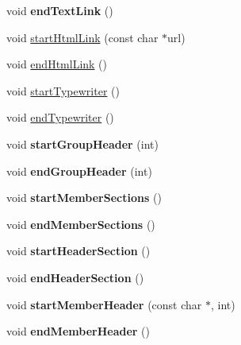 \begin{DoxyCompactItemize}
\mbox{\label{class_man_generator_ae0b59e20362769f00731c90f0e3fdc00}} 
void {\bfseries end\+Text\+Link} ()
\item 
void \mbox{\hyperlink{class_man_generator_a605e678d3be65519e6b94dff6e403e79}{start\+Html\+Link}} (const char $\ast$url)
\item 
void \mbox{\hyperlink{class_man_generator_a7323695cedb872064ddb450875b2baea}{end\+Html\+Link}} ()
\item 
void \mbox{\hyperlink{class_man_generator_aa03f575a82549d2393bb080337769f1c}{start\+Typewriter}} ()
\item 
void \mbox{\hyperlink{class_man_generator_a918922201985cac387c671a9767021d1}{end\+Typewriter}} ()
\item 
\mbox{\label{class_man_generator_a69dbc09e1398a0f64796d28a45642bba}} 
void {\bfseries start\+Group\+Header} (int)
\item 
\mbox{\label{class_man_generator_a826a7e069686709295c162b2b2db7e25}} 
void {\bfseries end\+Group\+Header} (int)
\item 
\mbox{\label{class_man_generator_a712f6f2ffa6fcc93d783510760a7a337}} 
void {\bfseries start\+Member\+Sections} ()
\item 
\mbox{\label{class_man_generator_a860d52eda1510b0c06177ac90c18b850}} 
void {\bfseries end\+Member\+Sections} ()
\item 
\mbox{\label{class_man_generator_a070bbb4b1984e6f82dd4798f1ac325da}} 
void {\bfseries start\+Header\+Section} ()
\item 
\mbox{\label{class_man_generator_aeaaf8704bdcaec06d4fe435491962d50}} 
void {\bfseries end\+Header\+Section} ()
\item 
\mbox{\label{class_man_generator_aa7d17ccd02a64a3bcbd97825bcf6a9cb}} 
void {\bfseries start\+Member\+Header} (const char $\ast$, int)
\item 
\mbox{\label{class_man_generator_ae8b551cb5b57bdafb99421c7d22b96e7}} 
void {\bfseries end\+Member\+Header} ()

\end{DoxyCompactItemize}
